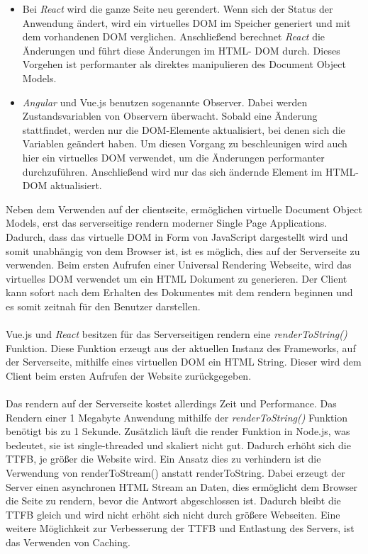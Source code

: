 \documentclass[runningheads]{llncs}
\begin{document}
\begin{itemize}
  \setlength\itemsep{1em}
  \item Bei \textit{React} wird die ganze Seite neu gerendert. 
  Wenn sich der Status der Anwendung ändert, 
  wird ein virtuelles DOM im Speicher generiert 
  und mit dem vorhandenen DOM verglichen. 
  Anschließend berechnet \textit{React} die Änderungen und führt diese 
  Änderungen im HTML- DOM durch. 
  Dieses Vorgehen ist performanter als direktes manipulieren 
  des Document Object Models.

  \item \textit{Angular} und Vue.js benutzen sogenannte Observer. 
  Dabei werden  Zustandsvariablen von Observern überwacht. 
  Sobald eine Änderung stattfindet, 
  werden nur die DOM-Elemente aktualisiert, 
  bei denen sich die Variablen geändert haben. 
  Um diesen Vorgang zu beschleunigen 
  wird auch hier ein virtuelles DOM verwendet, 
  um die Änderungen performanter durchzuführen. 
  Anschließend wird nur das sich ändernde Element im HTML- DOM aktualisiert.
\end{itemize}
Neben dem Verwenden auf der clientseite, 
ermöglichen virtuelle Document Object Models, 
erst das serverseitige rendern moderner Single Page Applications. 
Dadurch, dass das virtuelle DOM in Form von JavaScript dargestellt wird und 
somit unabhängig von dem Browser ist, 
ist es möglich, dies auf der Serverseite zu verwenden. 
Beim ersten Aufrufen einer Universal Rendering Webseite, 
wird das virtuelles DOM verwendet um ein HTML Dokument zu generieren. 
Der Client kann sofort nach dem Erhalten des Dokumentes mit dem rendern beginnen und 
es somit zeitnah für den Benutzer darstellen. \cite{krajka_2015}
\\
\\
Vue.js und \textit{React} besitzen für das Serverseitigen rendern eine \textit{renderToString()} Funktion. 
Diese Funktion erzeugt aus der aktuellen Instanz des Frameworks, 
auf der Serverseite, 
mithilfe eines virtuellen DOM ein HTML String. 
Dieser wird dem Client beim ersten Aufrufen der Website zurückgegeben.
\\
\\
Das rendern auf der Serverseite kostet allerdings Zeit und Performance. 
Das Rendern einer 1 Megabyte Anwendung mithilfe der \textit{renderToString() }
Funktion benötigt bis zu 1 Sekunde. 
Zusätzlich läuft die render Funktion in Node.js, 
was bedeutet, sie ist single-threaded und skaliert nicht gut. 
Dadurch erhöht sich die TTFB, je größer die Website wird. 
Ein Ansatz dies zu verhindern ist die Verwendung von renderToStream() anstatt renderToString. 
Dabei erzeugt der Server einen asynchronen HTML Stream an Daten, 
dies ermöglicht dem Browser die Seite zu rendern, 
bevor die Antwort abgeschlossen ist. 
Dadurch bleibt die TTFB gleich und 
wird nicht erhöht sich nicht durch größere Webseiten. 
Eine weitere Möglichkeit zur Verbesserung der TTFB und Entlastung des Servers, 
ist das Verwenden von Caching.
\end{document}
